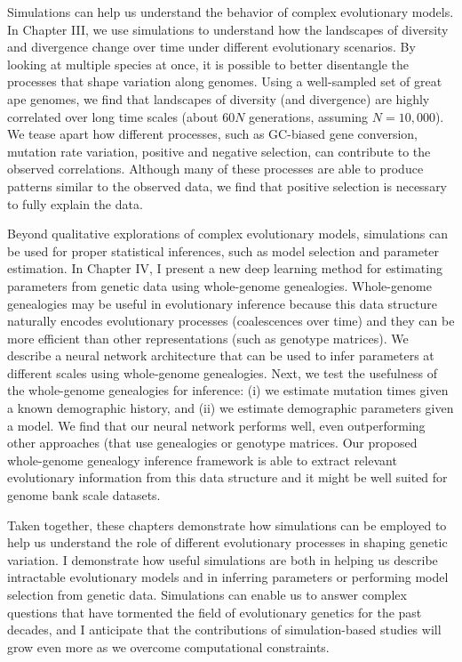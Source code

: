 Simulations can help us understand the behavior of complex evolutionary models.
In Chapter III, we use simulations to understand how the landscapes of diversity and divergence change over time under different evolutionary scenarios.
By looking at multiple species at once, it is possible to better disentangle the processes that shape variation along genomes.
Using a well-sampled set of great ape genomes, we find that landscapes of diversity (and divergence) are highly correlated over long time scales (about $60N$ generations, assuming $N=10,000$).
We tease apart how different processes, such as GC-biased gene conversion, mutation rate variation, positive and negative selection, can contribute to the observed correlations.
Although many of these processes are able to produce patterns similar to the observed data,
we find that positive selection is necessary to fully explain the data.

Beyond qualitative explorations of complex evolutionary models,
simulations can be used for proper statistical inferences, such as model selection and parameter estimation.
In Chapter IV, I present a new deep learning method for estimating parameters from genetic data using whole-genome genealogies.
Whole-genome genealogies may be useful in evolutionary inference because this data structure naturally encodes evolutionary processes (\eg coalescences over time) and they can be more efficient than other representations (such as genotype matrices).
We describe a neural network architecture that can be used to infer parameters at different scales using whole-genome genealogies.
Next, we test the usefulness of the whole-genome genealogies for inference:
(i) we estimate mutation times given a known demographic history,
and (ii) we estimate demographic parameters given a model.
We find that our neural network performs well, even outperforming other approaches (that use genealogies or genotype matrices.
Our proposed whole-genome genealogy inference framework is able to extract relevant evolutionary information from this data structure and it might be well suited for genome bank scale datasets.

Taken together, these chapters demonstrate how simulations can be employed to help us understand the role of different evolutionary processes in shaping genetic variation.
I demonstrate how useful simulations are both in helping us describe intractable evolutionary models and in inferring parameters or performing model selection from genetic data.
Simulations can enable us to answer complex questions that have tormented the field of evolutionary genetics for the past decades, 
and I anticipate that the contributions of simulation-based studies will grow even more as we overcome computational constraints.
